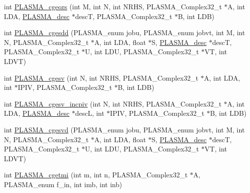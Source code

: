 \begin{DoxyCompactItemize}
\item 
int \hyperlink{group__PLASMA__Complex32__t_ga961a4dfc433c5086670b813e5fa53bbf_ga961a4dfc433c5086670b813e5fa53bbf}{P\+L\+A\+S\+M\+A\+\_\+cgeqrs} (int M, int N, int N\+R\+H\+S, P\+L\+A\+S\+M\+A\+\_\+\+Complex32\+\_\+t $\ast$A, int L\+D\+A, \hyperlink{structplasma__desc__t}{P\+L\+A\+S\+M\+A\+\_\+desc} $\ast$desc\+T, P\+L\+A\+S\+M\+A\+\_\+\+Complex32\+\_\+t $\ast$B, int L\+D\+B)
\item 
int \hyperlink{group__PLASMA__Complex32__t_gafee4a25fd8dad584ec50f1718a319a8b_gafee4a25fd8dad584ec50f1718a319a8b}{P\+L\+A\+S\+M\+A\+\_\+cgesdd} (P\+L\+A\+S\+M\+A\+\_\+enum jobu, P\+L\+A\+S\+M\+A\+\_\+enum jobvt, int M, int N, P\+L\+A\+S\+M\+A\+\_\+\+Complex32\+\_\+t $\ast$A, int L\+D\+A, float $\ast$S, \hyperlink{structplasma__desc__t}{P\+L\+A\+S\+M\+A\+\_\+desc} $\ast$desc\+T, P\+L\+A\+S\+M\+A\+\_\+\+Complex32\+\_\+t $\ast$U, int L\+D\+U, P\+L\+A\+S\+M\+A\+\_\+\+Complex32\+\_\+t $\ast$V\+T, int L\+D\+V\+T)
\item 
int \hyperlink{group__PLASMA__Complex32__t_ga5ec3217862ee4b820b9cd9d4b343bfae_ga5ec3217862ee4b820b9cd9d4b343bfae}{P\+L\+A\+S\+M\+A\+\_\+cgesv} (int N, int N\+R\+H\+S, P\+L\+A\+S\+M\+A\+\_\+\+Complex32\+\_\+t $\ast$A, int L\+D\+A, int $\ast$I\+P\+I\+V, P\+L\+A\+S\+M\+A\+\_\+\+Complex32\+\_\+t $\ast$B, int L\+D\+B)
\item 
int \hyperlink{group__PLASMA__Complex32__t_gade54f0cdad2648b241e2701e0e07cbce_gade54f0cdad2648b241e2701e0e07cbce}{P\+L\+A\+S\+M\+A\+\_\+cgesv\+\_\+incpiv} (int N, int N\+R\+H\+S, P\+L\+A\+S\+M\+A\+\_\+\+Complex32\+\_\+t $\ast$A, int L\+D\+A, \hyperlink{structplasma__desc__t}{P\+L\+A\+S\+M\+A\+\_\+desc} $\ast$desc\+L, int $\ast$I\+P\+I\+V, P\+L\+A\+S\+M\+A\+\_\+\+Complex32\+\_\+t $\ast$B, int L\+D\+B)
\item 
int \hyperlink{group__PLASMA__Complex32__t_gaf3b4470de63deb5f9f8e52247d0ec951_gaf3b4470de63deb5f9f8e52247d0ec951}{P\+L\+A\+S\+M\+A\+\_\+cgesvd} (P\+L\+A\+S\+M\+A\+\_\+enum jobu, P\+L\+A\+S\+M\+A\+\_\+enum jobvt, int M, int N, P\+L\+A\+S\+M\+A\+\_\+\+Complex32\+\_\+t $\ast$A, int L\+D\+A, float $\ast$S, \hyperlink{structplasma__desc__t}{P\+L\+A\+S\+M\+A\+\_\+desc} $\ast$desc\+T, P\+L\+A\+S\+M\+A\+\_\+\+Complex32\+\_\+t $\ast$U, int L\+D\+U, P\+L\+A\+S\+M\+A\+\_\+\+Complex32\+\_\+t $\ast$V\+T, int L\+D\+V\+T)
\item 
int \hyperlink{group__PLASMA__Complex32__t_gaff63154cd26252fca45b2574d0bdcefa_gaff63154cd26252fca45b2574d0bdcefa}{P\+L\+A\+S\+M\+A\+\_\+cgetmi} (int m, int n, P\+L\+A\+S\+M\+A\+\_\+\+Complex32\+\_\+t $\ast$A, P\+L\+A\+S\+M\+A\+\_\+enum f\+\_\+in, int imb, int inb)

\end{DoxyCompactItemize}
